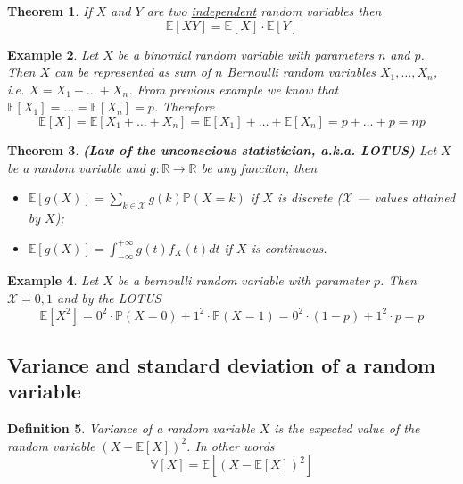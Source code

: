 \documentclass[12pt]{article}
\newtheorem{theorem}{Theorem}[subsection]
\newtheorem{definition}[theorem]{Definition}
\newtheorem{example}[theorem]{Example}
\begin{document}
\begin{theorem} If $X$ and $Y$ are two \underline{independent} random variables
    then
    $$
        \mathbb{E}[XY]=\mathbb{E}[X]\cdot\mathbb{E}[Y]
    $$
\end{theorem}

\begin{example} Let $X$ be a binomial random variable with parameters $n$ and
    $p$. Then $X$ can be represented as sum of $n$ Bernoulli random variables
    $X_1,\ldots,X_n$, i.e. $X=X_1+\ldots+X_n$.     %
    From previous example we know
    that $\mathbb{E}[X_1]=\ldots=\mathbb{E}[X_n]=p$. Therefore    %
    $$
        \mathbb{E}[X]
        =\mathbb{E}[X_1+\ldots+X_n]     %
        =\mathbb{E}[X_1]+\ldots+\mathbb{E}[X_n]    %
        =p+\ldots+p=np    %
    $$
\end{example}

\begin{theorem} \textbf{(Law of the unconscious statistician, a.k.a. LOTUS)} Let
    $X$ be a random variable and $g:\mathbb{R}\to\mathbb{R}$ be any funciton,
    then
    \begin{itemize}
        \item $\mathbb{E}[g(X)]=\sum_{k\in\mathcal{X}}g(k)\mathbb{P}(X=k)$ if
              $X$ is discrete ($\mathcal{X}$ --- values attained by $X$);
        \item $\mathbb{E}[g(X)]=\int_{-\infty}^{+\infty} g(t)f_X(t)dt$ if $X$ is
              continuous.
    \end{itemize}
\end{theorem}

\begin{example} Let $X$ be a bernoulli random variable with parameter $p$. Then
    $\mathcal{X}={0,1}$ and by the LOTUS
    $$
        \mathbb{E}[X^2]=
        0^2\cdot\mathbb{P}(X=0)+1^2\cdot\mathbb{P}(X=1)
        =0^2\cdot (1-p)+1^2\cdot p=p
    $$
\end{example}


\subsection{Variance and standard deviation of a random variable}

\begin{definition} Variance of a random variable $X$ is the expected value of
    the random variable ${(X-\mathbb{E}[X])}^2$. In other words
    $$
        \mathbb{V}[X]=\mathbb{E}[{(X-\mathbb{E}[X])}^2]
    $$
\end{definition}
\end{document}
